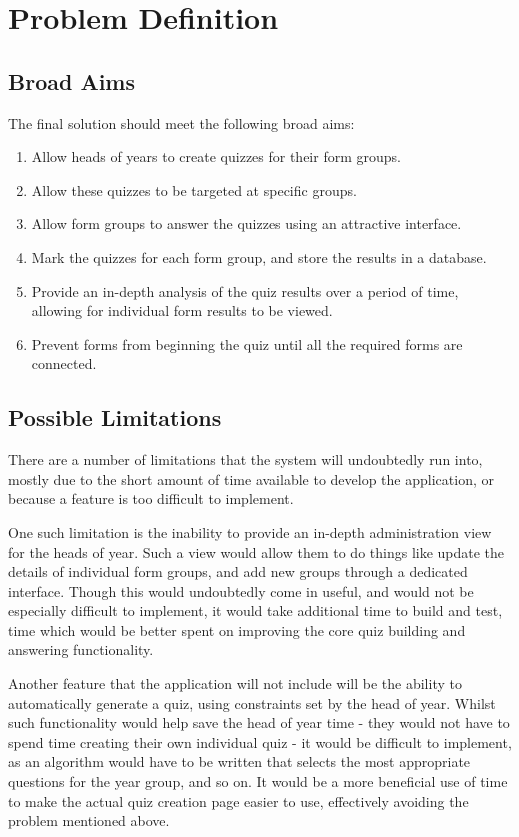 \section{Problem Definition}

\subsection{Broad Aims}
The final solution should meet the following broad aims:

\begin{enumerate}
	\item Allow heads of years to create quizzes for their form groups.
	\item Allow these quizzes to be targeted at specific groups.
	\item Allow form groups to answer the quizzes using an attractive interface.
	\item Mark the quizzes for each form group, and store the results in a database.
	\item Provide an in-depth analysis of the quiz results over a period of time, allowing for individual form results to be viewed.
	\item Prevent forms from beginning the quiz until all the required forms are connected.
\end{enumerate}

\subsection{Possible Limitations}
There are a number of limitations that the system will undoubtedly run into, mostly due to the short amount of time available to develop the application, or because a feature is too difficult to implement.

One such limitation is the inability to provide an in-depth administration view for the heads of year. Such a view would allow them to do things like update the details of individual form groups, and add new groups through a dedicated interface. Though this would undoubtedly come in useful, and would not be especially difficult to implement, it would take additional time to build and test, time which would be better spent on improving the core quiz building and answering functionality.

Another feature that the application will not include will be the ability to automatically generate a quiz, using constraints set by the head of year. Whilst such functionality would help save the head of year time - they would not have to spend time creating their own individual quiz - it would be difficult to implement, as an algorithm would have to be written that selects the most appropriate questions for the year group, and so on. It would be a more beneficial use of time to make the actual quiz creation page easier to use, effectively avoiding the problem mentioned above.

